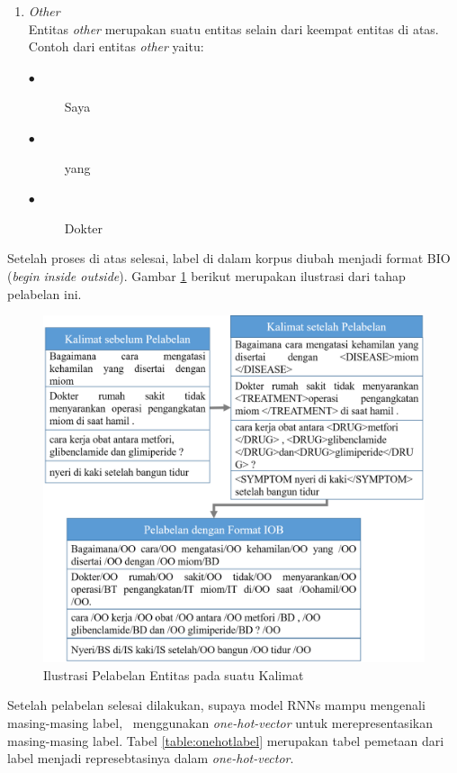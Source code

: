 \begin{enumerate}
	\item \textit{Other}\\
	Entitas \textit{other} merupakan suatu entitas selain dari keempat entitas di atas. Contoh dari entitas \textit{other} yaitu:
	\begin{description}
		\item[$\bullet$] Saya
		\item[$\bullet$] yang
		\item[$\bullet$] Dokter
	\end{description}

\end{enumerate}
Setelah proses di atas selesai, label di dalam korpus diubah menjadi format BIO (\textit{begin inside outside}). Gambar \ref{fig:pelabelan} berikut merupakan ilustrasi dari tahap pelabelan ini.
\begin{figure}
	\centering
	\includegraphics[width=0.85\linewidth]{images/pelabelan}
	\caption{Ilustrasi Pelabelan Entitas pada suatu Kalimat}
	\label{fig:pelabelan}
\end{figure}

Setelah pelabelan selesai dilakukan, supaya model RNNs mampu mengenali masing-masing label, \saya~menggunakan \textit{one-hot-vector} untuk merepresentasikan masing-masing label. Tabel \ref{table:onehotlabel} merupakan tabel pemetaan dari label menjadi represebtasinya dalam \textit{one-hot-vector}.

